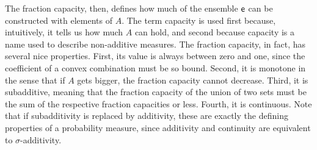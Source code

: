 The fraction capacity, then, defines how much of the ensemble $\mathsf{e}$ can be constructed with elements of $A$. The term capacity is used first because, intuitively, it tells us how much $A$ can hold, and second because capacity is a name used to describe non-additive measures. The fraction capacity, in fact, has several nice properties. First, its value is always between zero and one, since the coefficient of a convex combination must be so bound. Second, it is monotone in the sense that if $A$ gets bigger, the fraction capacity cannot decrease. Third, it is subadditive, meaning that the fraction capacity of the union of two sets must be the sum of the respective fraction capacities or less. Fourth, it is continuous. Note that if subadditivity is replaced by additivity, these are exactly the defining properties of a probability measure, since additivity and continuity are equivalent to $\sigma$-additivity.

